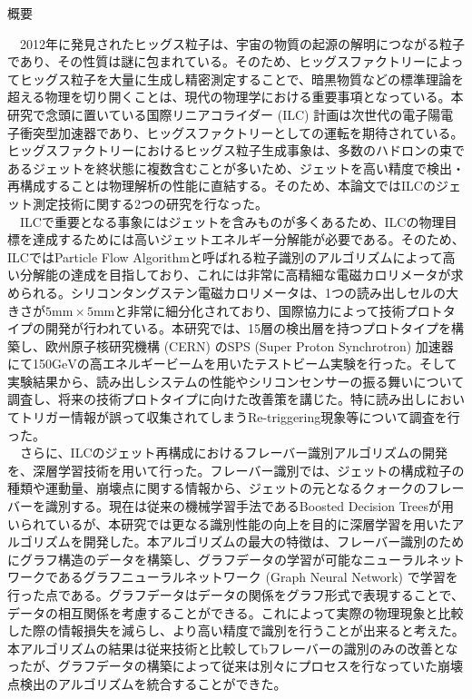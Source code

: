 
\ifabstract
 \maketitle
\fi
\begin{center}
{\LARGE 概要}\\
\end{center}
　2012年に発見されたヒッグス粒子は、宇宙の物質の起源の解明につながる粒子であり、その性質は謎に包まれている。そのため、ヒッグスファクトリーによってヒッグス粒子を大量に生成し精密測定することで、暗黒物質などの標準理論を超える物理を切り開くことは、現代の物理学における重要事項となっている。本研究で念頭に置いている国際リニアコライダー (ILC) 計画は次世代の電子陽電子衝突型加速器であり、ヒッグスファクトリーとしての運転を期待されている。ヒッグスファクトリーにおけるヒッグス粒子生成事象は、多数のハドロンの束であるジェットを終状態に複数含むことが多いため、ジェットを高い精度で検出・再構成することは物理解析の性能に直結する。そのため、本論文ではILCのジェット測定技術に関する2つの研究を行なった。\\
　ILCで重要となる事象にはジェットを含みものが多くあるため、ILCの物理目標を達成するためには高いジェットエネルギー分解能が必要である。そのため、ILCではParticle Flow Algorithmと呼ばれる粒子識別のアルゴリズムによって高い分解能の達成を目指しており、これには非常に高精細な電磁カロリメータが求められる。シリコンタングステン電磁カロリメータは、1つの読み出しセルの大きさが$5\mathrm{mm} \times 5\mathrm{mm}$と非常に細分化されており、国際協力によって技術プロトタイプの開発が行われている。本研究では、15層の検出層を持つプロトタイプを構築し、欧州原子核研究機構 (CERN) のSPS (Super Proton Synchrotron) 加速器にて150$\mathrm{GeV}$の高エネルギービームを用いたテストビーム実験を行った。そして実験結果から、読み出しシステムの性能やシリコンセンサーの振る舞いについて調査し、将来の技術プロトタイプに向けた改善策を講じた。特に読み出しにおいてトリガー情報が誤って収集されてしまうRe-triggering現象等について調査を行った。\\
　さらに、ILCのジェット再構成におけるフレーバー識別アルゴリズムの開発を、深層学習技術を用いて行った。フレーバー識別では、ジェットの構成粒子の種類や運動量、崩壊点に関する情報から、ジェットの元となるクォークのフレーバーを識別する。現在は従来の機械学習手法であるBoosted Decision Treesが用いられているが、本研究では更なる識別性能の向上を目的に深層学習を用いたアルゴリズムを開発した。本アルゴリズムの最大の特徴は、フレーバー識別のためにグラフ構造のデータを構築し、グラフデータの学習が可能なニューラルネットワークであるグラフニューラルネットワーク (Graph Neural Network) で学習を行った点である。グラフデータはデータの関係をグラフ形式で表現することで、データの相互関係を考慮することができる。これによって実際の物理現象と比較した際の情報損失を減らし、より高い精度で識別を行うことが出来ると考えた。本アルゴリズムの結果は従来技術と比較してbフレーバーの識別のみの改善となったが、グラフデータの構築によって従来は別々にプロセスを行なっていた崩壊点検出のアルゴリズムを統合することができた。
